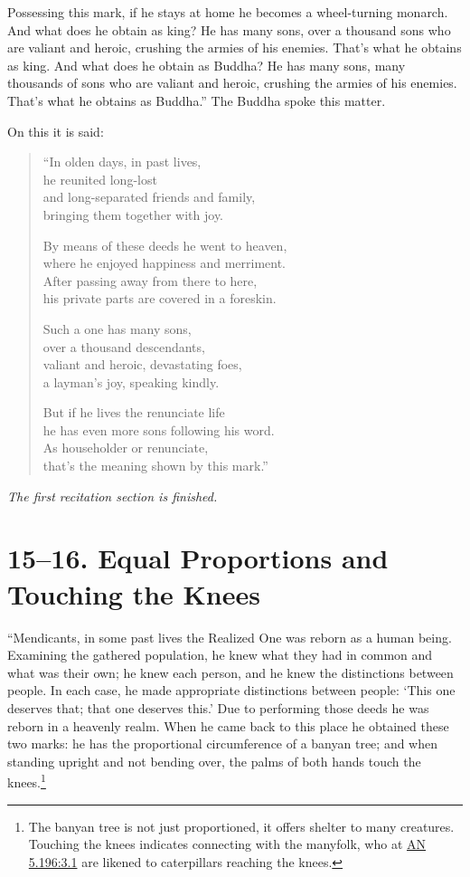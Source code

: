 \documentclass[12pt,openany]{book}%
\newcommand*{\scendsection}[1]{\begin{Center}\begin{small}\textit{#1}\end{small}\end{Center}\addvspace{1em}}
\begin{document}
Possessing this mark, if he stays at home he becomes a wheel-turning monarch. And what does he obtain as king? He has many sons, over a thousand sons who are valiant and heroic, crushing the armies of his enemies. That’s what he obtains as king. And what does he obtain as Buddha? He has many sons, many thousands of sons who are valiant and heroic, crushing the armies of his enemies. That’s what he obtains as Buddha.” The Buddha spoke this matter. 

On this it is said: 

\begin{verse}%
“In olden days, in past lives, \\
he reunited long-lost \\
and long-separated friends and family, \\
bringing them together with joy. 

By means of these deeds he went to heaven, \\
where he enjoyed happiness and merriment. \\
After passing away from there to here, \\
his private parts are covered in a foreskin. 

Such a one has many sons, \\
over a thousand descendants, \\
valiant and heroic, devastating foes, \\
a layman’s joy, speaking kindly. 

But if he lives the renunciate life \\
he has even more sons following his word. \\
As householder or renunciate, \\
that’s the meaning shown by this mark.” 

%
\end{verse}

\scendsection{The first recitation section is finished. }

\section*{15–16. Equal Proportions and Touching the Knees }

“Mendicants, in some past lives the Realized One was reborn as a human being. Examining the gathered population, he knew what they had in common and what was their own; he knew each person, and he knew the distinctions between people. In each case, he made appropriate distinctions between people: ‘This one deserves that; that one deserves this.’ Due to performing those deeds he was reborn in a heavenly realm. When he came back to this place he obtained these two marks: he has the proportional circumference of a banyan tree; and when standing upright and not bending over, the palms of both hands touch the knees.\footnote{The banyan tree is not just proportioned, it offers shelter to many creatures. Touching the knees indicates connecting with the manyfolk, who at \href{https://suttacentral.net/an5.196/en/sujato\#3.1}{AN 5.196:3.1} are likened to caterpillars reaching the knees. } 
\end{document}

